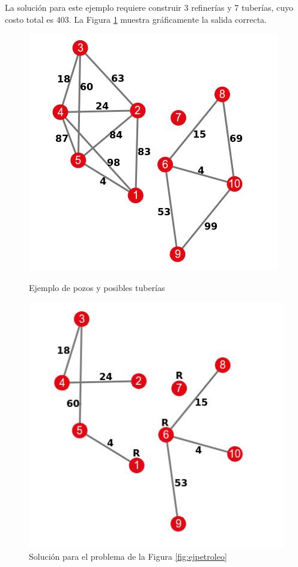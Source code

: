La solución para este ejemplo requiere construir 3 refinerías y 7 tuberías, cuyo costo total es 403. La Figura \ref{fig:ejpetroleores} muestra gráficamente la salida correcta.

\begin{figure}[!htb]
\begin{center}
  \includegraphics[scale=0.5]{imagenes/ejemplopetroleo.jpeg}
\end{center}
  \caption{Ejemplo de pozos y posibles tuberías}\label{fig:ejpetroleo}
\endminipage
{}
\begin{center}
  \includegraphics[scale=0.5]{imagenes/ejemplopetroleores.jpeg}
\end{center}
  \caption{Solución para el problema de la Figura \ref{fig:ejpetroleo}}\label{fig:ejpetroleores}
\endminipage
\end{figure}


